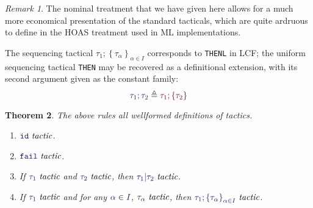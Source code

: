 \documentclass[11pt]{article}
\newtheorem{thm}{Theorem}[section]
\theoremstyle{definition}
\theoremstyle{remark}
\newtheorem{remark}[thm]{Remark}
\numberwithin{equation}{section}
\def\IModeColorName{MidnightBlue}
\def\OModeColorName{Maroon}
\newcommand\IMode[1]{{\color{\IModeColorName}{#1}}}
\newcommand\OMode[1]{{\color{\OModeColorName}{#1}}}
\newcommand\IsTac[1]{\IMode{#1}\ \textit{tactic}}
\newcommand\MkSet[1]{\left\{#1\right\}}
\newcommand\MkFam[3]{\MkSet{#1_{#2}}_{#2\in #3}}
\newcommand\Member[2]{\IMode{#1}\in\IMode{#2}}
\newcommand\IdTac{\mathtt{id}}
\newcommand\FailTac{\mathtt{fail}}
\newcommand\OrElseTac[2]{#1\vert#2}
\newcommand\ThenTac[2]{#1;#2}
\begin{document}
\begin{remark}
  The nominal treatment that we have given here allows for a much more
  economical presentation of the standard tacticals, which are quite ardruous
  to define in the HOAS treatment used in ML implementations.
\end{remark}

The sequencing tactical
$\ThenTac{\tau_1}{\MkFam{\tau}{\alpha}{I}}$ corresponds to
\verb!THENL! in LCF; the uniform sequencing tactical \verb!THEN! may be
recovered as a definitional extension, with its second argument given as the
constant family:
\[
    \IMode{\ThenTac{\tau_1}{\tau_2}}
    \triangleq
    \OMode{\ThenTac{\tau_1}{\MkSet{\tau_2}}}
\]

\begin{thm}
  The above rules all wellformed definitions of tactics.
  \begin{enumerate}
    \item $\IsTac{\IdTac}$.
    \item $\IsTac{\FailTac}$.
    \item If $\IsTac{\tau_1}$ and $\IsTac{\tau_2}$, then
      $\IsTac{\OrElseTac{\tau_1}{\tau_2}}$.

    \item If $\IsTac{\tau_1}$ and for any $\Member{\alpha}{I}$,
      $\IsTac{\tau_\alpha}$, then
      $\IsTac{\ThenTac{\tau_1}{\MkFam{\tau}{\alpha}{I}}}$.
  \end{enumerate}
\end{thm}
\end{document}
